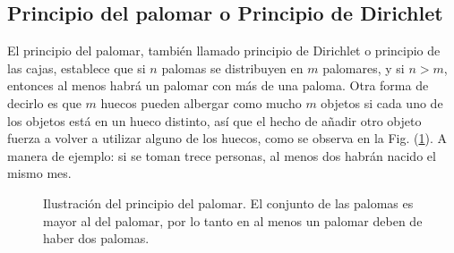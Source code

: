 
\subsection{Principio del palomar o Principio de Dirichlet}

El principio del palomar, también llamado principio de Dirichlet o principio de
las cajas, establece que si $n$ palomas se distribuyen en $m$ palomares, y si $n
> m$, entonces al menos habrá un palomar con más de una paloma. Otra forma de
decirlo es que $m$ huecos pueden albergar como mucho $m$ objetos si cada uno de
los objetos está en un hueco distinto, así que el hecho de añadir otro objeto
fuerza a volver a utilizar alguno de los huecos, como se observa en la Fig.
(\ref{palomar}). A manera de ejemplo: si se toman trece personas, al menos dos
habrán nacido el mismo mes.

\begin{figure}[h]
	\centering
\caption{Ilustración del principio del palomar. El conjunto de las palomas es
mayor al del palomar, por lo tanto en al menos un palomar deben de haber dos
palomas.}
\label{palomar}
	\end{figure}

